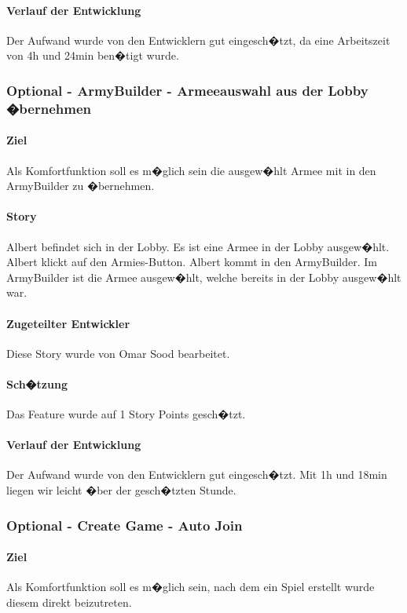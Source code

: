 \documentclass[12pt, titlepage]{scrartcl}
\begin{document}
			\paragraph{Verlauf der Entwicklung} 
			Der Aufwand wurde von den Entwicklern gut eingesch�tzt, da eine Arbeitszeit von 4h und 24min ben�tigt wurde.
		
			\subsubsection{Optional - ArmyBuilder - Armeeauswahl aus der Lobby �bernehmen}
			\paragraph{Ziel} Als Komfortfunktion soll es m�glich sein die ausgew�hlt Armee mit in den ArmyBuilder zu �bernehmen.
			\paragraph{Story} Albert befindet sich in der Lobby. Es ist eine Armee in der Lobby ausgew�hlt. Albert klickt auf den Armies-Button. Albert kommt in den ArmyBuilder. Im ArmyBuilder ist die Armee ausgew�hlt, welche bereits in der Lobby ausgew�hlt war.
			\paragraph{Zugeteilter Entwickler} Diese Story wurde von Omar Sood bearbeitet.
			\paragraph{Sch�tzung}
			Das Feature wurde auf 1 Story Points gesch�tzt.
			\paragraph{Verlauf der Entwicklung} 
			Der Aufwand wurde von den Entwicklern gut eingesch�tzt. Mit 1h und 18min liegen wir leicht �ber der gesch�tzten Stunde.
			
			\subsubsection{Optional - Create Game - Auto Join}
			\paragraph{Ziel} Als Komfortfunktion soll es m�glich sein, nach dem ein Spiel erstellt wurde diesem direkt beizutreten.
\end{document}
